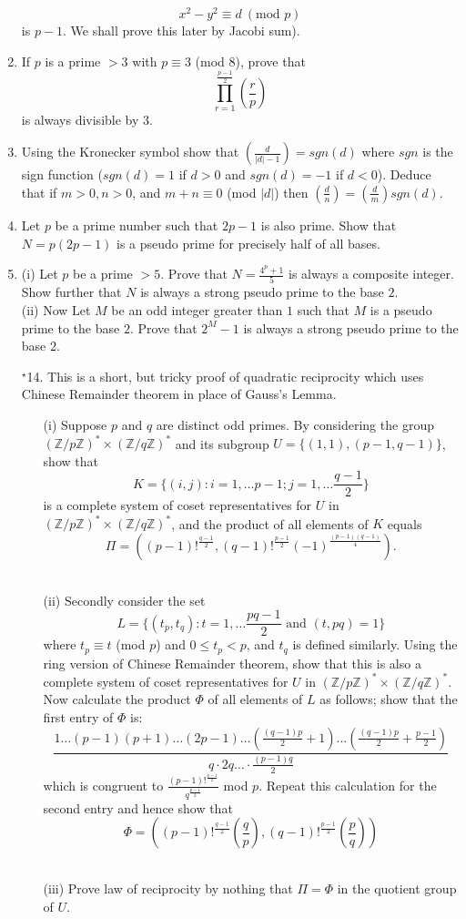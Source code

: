 \begin{enumerate}
    $$x^2-y^2 \equiv d~(\text{mod } p)$$
    is $p-1$. We shall prove this later by Jacobi sum).
\item If $p$ is a prime $>3$ with $p \equiv 3$ (mod $8$), prove that
$$\prod_{r=1}^{\frac{p-1}{2}}(\frac{r}{p})$$ is always divisible by $3$.
\item Using the Kronecker symbol show that $(\frac{d}{|d|-1})=sgn(d)$ where $sgn$ is the sign function ($sgn(d)=1$ if $d>0$ and $sgn(d)=-1$ if $d<0$). Deduce that if $m>0,n>0$, and $m+n \equiv 0$ (mod $|d|$) then $(\frac{d}{n})=(\frac{d}{m})sgn(d)$.
\item Let $p$ be a prime number such that $2p-1$ is also prime. Show that $N=p(2p-1)$ is a pseudo prime for precisely half of all bases.
\item (i) Let $p$ be a prime $>5$. Prove that $N=\frac{4^p+1}{5}$ is always a composite integer. Show further that $N$ is always a strong pseudo prime to the base $2$. \\
     (ii) Now Let $M$ be an odd integer greater than $1$ such that $M$ is a pseudo prime to the base $2$. Prove that $2^M -1$ is always a strong pseudo prime to the base $2$.
\item[$^{\star}$14.] This is a short, but tricky proof of quadratic reciprocity which uses Chinese Remainder theorem in place of Gauss's Lemma.
    \begin{enumerate}
    \item[(i)] Suppose $p$ and $q$ are distinct odd primes. By considering the group
    $(\mathbb{Z}/p\mathbb{Z})^* \times (\mathbb{Z}/q\mathbb{Z})^*$ and its subgroup
    $U=\{(1,1),(p-1,q-1)\}$, show that
    $$K=\{(i,j): i=1,\ldots p-1;j=1,\ldots \frac{q-1}{2}\}$$
    is a complete system of coset representatives for $U$ in $(\mathbb{Z}/p\mathbb{Z})^* \times (\mathbb{Z}/q\mathbb{Z})^*$, and the product of all elements of $K$ equals
    $$\Pi= ((p-1)!^{\frac{q-1}{2}},(q-1)!^{\frac{p-1}{2}}(-1)^{\frac{(p-1)(q-1)}{4}}).$$\\
    \item[(ii)] Secondly consider the set
    $$L=\{(t_p,t_q): t=1, \ldots \frac{pq-1}{2} \text{ and } (t,pq)=1\}$$
    where $t_p \equiv t$ (mod $p$) and $0 \le t_p <p$, and $t_q$ is defined similarly. Using the ring version of Chinese Remainder theorem, show that this is also a complete system of coset representatives for $U$ in $(\mathbb{Z}/p\mathbb{Z})^* \times (\mathbb{Z}/q\mathbb{Z})^*$. Now calculate the product $\Phi$ of all elements of $L$ as follows; show that the first entry of $\Phi$ is:
    $$\frac{1 \ldots (p-1)(p+1)\ldots(2p-1)\ldots
    (\frac{(q-1)p}{2}+1) \ldots (\frac{(q-1)p}{2}+\frac{p-1}{2})}
    {q \cdot 2q \ldots \cdot \frac{(p-1)q}{2}}$$
    which is congruent to $\frac{(p-1)!^{\frac{q-1}{2}}}{q^{\frac{p-1}{2}}}$ mod $p$. Repeat this calculation for the second entry and hence show that
    $$\Phi=((p-1)!^{\frac{q-1}{2}}\left(\frac{q}{p}\right),
    (q-1)!^{\frac{p-1}{2}}\left(\frac{p}{q}\right))$$\\
    \item[(iii)] Prove law of reciprocity by nothing that $\Pi = \Phi$ in the quotient group of $U$.
    \end{enumerate}
\end{enumerate}

